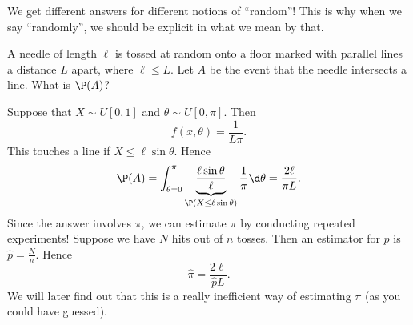 \documentclass[a4paper]{article}
\begin{document}
\begin{eg}
\begin{enumerate}
\begin{center}
      \end{center}
  \end{enumerate}
  We get different answers for different notions of ``random''! This is why when we say ``randomly'', we should be explicit in what we mean by that.
\end{eg}

\begin{eg}
  A needle of length $\ell$ is tossed at random onto a floor marked with parallel lines a distance $L$ apart, where $\ell \leq L$. Let $A$ be the event that the needle intersects a line.  What is $\P(A)$?
  \begin{center}
  \end{center}
  Suppose that $X\sim U[0, 1]$ and $\theta\sim U[0, \pi]$. Then
  \[
    f(x, \theta) = \frac{1}{L\pi}.
  \]
  This touches a line if $X \leq \ell \sin \theta$. Hence
  \[
    \P(A) = \int_{\theta = 0}^\pi \underbrace{\frac{\ell \sin \theta}{\ell}}_{\P(X \leq \ell\sin \theta)}\frac{1}{\pi}\d \theta = \frac{2\ell }{\pi L}.
  \]
  Since the answer involves $\pi$, we can estimate $\pi$ by conducting repeated experiments! Suppose we have $N$ hits out of $n$ tosses. Then an estimator for $p$ is $\hat{p} = \frac{N}{n}$. Hence
  \[
    \hat{\pi} = \frac{2\ell}{\hat{p}L}.
  \]
  We will later find out that this is a really inefficient way of estimating $\pi$ (as you could have guessed).
\end{eg}
\end{document}
